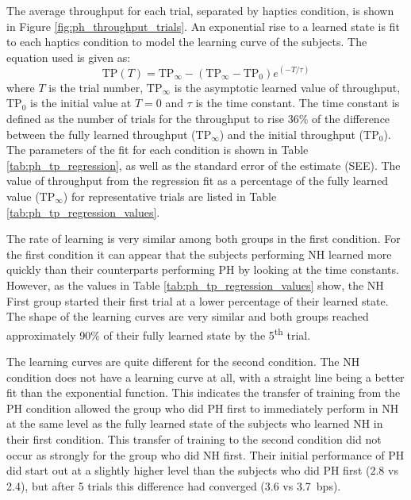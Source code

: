 The average throughput for each trial, separated by haptics condition, is shown in Figure \ref{fig:ph_throughput_trials}.
An exponential rise to a learned state is fit to each haptics condition to model the learning curve of the subjects.
The equation used is given as:
\begin{equation}
    \mathrm{TP}(T) = \mathrm{TP}_{\infty} - (\mathrm{TP}_{\infty}-\mathrm{TP}_0)e^{\left( -T / \tau \right)}
    \label{eq:ph_learning}
\end{equation}
where $T$ is the trial number, $\mathrm{TP}_{\infty}$ is the asymptotic learned value of throughput, $\mathrm{TP}_0$ is the initial value at $T=0$ and $\tau$ is the time constant.
The time constant is defined as the number of trials for the throughput to rise 36\% of the difference between the fully learned throughput ($\mathrm{TP}_{\infty}$) and the initial throughput ($\mathrm{TP}_0$).
The parameters of the fit for each condition is shown in Table \ref{tab:ph_tp_regression}, as well as the standard error of the estimate (SEE).
The value of throughput from the regression fit as a percentage of the fully learned value ($\mathrm{TP}_{\infty}$) for representative trials are listed in Table \ref{tab:ph_tp_regression_values}.

The rate of learning is very similar among both groups in the first condition.
For the first condition it can appear that the subjects performing NH learned more quickly than their counterparts performing PH by looking at the time constants.
However, as the values in Table \ref{tab:ph_tp_regression_values} show, the NH First group started their first trial at a lower percentage of their learned state.
The shape of the learning curves are very similar and both groups reached approximately 90\% of their fully learned state by the 5\textsuperscript{th} trial.

The learning curves are quite different for the second condition.
The NH condition does not have a learning curve at all, with a straight line being a better fit than the exponential function.
This indicates the transfer of training from the PH condition allowed the group who did PH first to immediately perform in NH at the same level as the fully learned state of the subjects who learned NH in their first condition.
This transfer of training to the second condition did not occur as strongly for the group who did NH first.
Their initial performance of PH did start out at a slightly higher level than the subjects who did PH first (\SI{2.8}{\bps} vs \SI{2.4}{\bps}), but after 5 trials this difference had converged (\SI{3.6}{\bps} vs \SI{3.7}{bps}).

